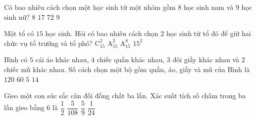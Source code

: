 \begin{ex}%
	Có bao nhiêu cách chọn một học sinh từ một nhóm gồm $8$ học sinh nam và $9$ học sinh nữ? 
	\choice
	{$8$}
	{$17$}
	{\True $72$}
	{$9$}
\end{ex}

\begin{ex}%
	Một tổ có $15$ học sinh. Hỏi có bao nhiêu cách chọn $2$ học sinh từ tổ đó để giữ hai chức vụ tổ trưởng và tổ phó?
	\choice
	{$\mathrm{C}_{15}^2$}
	{\True $\mathrm{A}_{15}^2$}
	{$\mathrm{A}_{15}^8$}
	{$15^2$}
\end{ex}

\begin{ex}%
	Bình có $5$ cái áo khác nhau, $4$ chiếc quần khác nhau, $3$ đôi giầy khác nhau và $2$ chiếc mũ khác nhau. Số cách chọn một bộ gồm quần, áo, giầy và mũ của Bình là
	\choice
	{\True $120$}
	{$60$}
	{$5$}
	{$14$}
\end{ex}

\begin{ex}%
	Gieo một con súc sắc cân đối đồng chất ba lần. Xác suất tích số chấm trong ba lần gieo bằng $6$ là
	\choice
	{$\dfrac{1}{2}$}
	{$\dfrac{5}{108}$}
	{$\dfrac{5}{9}$}
	{\True $\dfrac{1}{24}$}
\end{ex}

